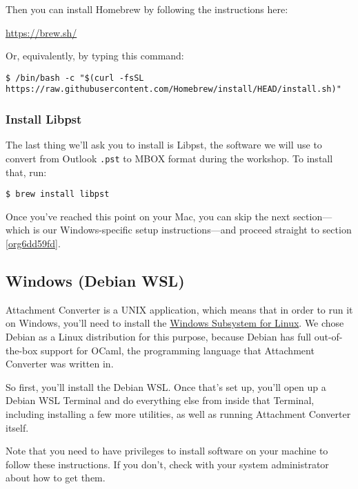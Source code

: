 \documentclass[11pt]{article}
\begin{document}
Then you can install Homebrew by following the instructions here:

\url{https://brew.sh/}

Or, equivalently, by typing this command:

\footnotesize

\begin{verbatim}
$ /bin/bash -c "$(curl -fsSL https://raw.githubusercontent.com/Homebrew/install/HEAD/install.sh)"
\end{verbatim}

\normalsize

\subsubsection{Install Libpst}
\label{sec:org6df4943}

The last thing we'll ask you to install is Libpst, the software we
will use to convert from Outlook \texttt{.pst} to MBOX format during the
workshop.  To install that, run:

\begin{verbatim}
$ brew install libpst
\end{verbatim}

Once you've reached this point on your Mac, you can skip the next
section---which is our Windows-specific setup instructions---and
proceed straight to section \ref{org6dd59fd}.

\subsection{Windows (Debian WSL) \label{org4566a47}}
\label{sec:orgbc7d770}

Attachment Converter is a UNIX application, which means that in order
to run it on Windows, you'll need to install the \href{https://en.wikipedia.org/wiki/Windows\_Subsystem\_for\_Linux}{Windows Subsystem for
Linux}.  We chose Debian as a Linux distribution for this purpose,
because Debian has full out-of-the-box support for OCaml, the
programming language that Attachment Converter was written in.

So first, you'll install the Debian WSL.  Once that's set up, you'll
open up a Debian WSL Terminal and do everything else from inside that
Terminal, including installing a few more utilities, as well as
running Attachment Converter itself.

Note that you need to have privileges to install software on your
machine to follow these instructions.  If you don't, check with your
system administrator about how to get them.
\end{document}
